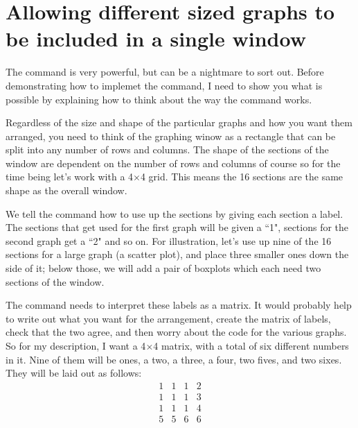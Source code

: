 \section{Allowing different sized graphs to be included in a single window} 
 
The  command is very powerful, but can be a nightmare to sort out. Before demonstrating how to implemet the command, I need to show you what is possible by explaining how to think about the way the command works. 
 
Regardless of the size and shape of the particular graphs and how you want them arranged, you need to think of the graphing winow as a rectangle that can be split into any number of rows and columns. The shape of the sections of the window are dependent on the number of rows and columns of course so for the time being let's work with a 4$\times$4 grid. This means the 16 sections are the same shape as the overall window. 
 
We tell the  command how to use up the sections by giving each section a label. The sections that get used for the first graph will be given a ``1", sections for the second graph get a ``2" and so on. For illustration, let's use up nine of the 16 sections for a large graph (a scatter plot), and place three smaller ones down the side of it; below those, we will add a pair of boxplots which each need two sections of the window. 
 
The  command needs to interpret these labels as a matrix. It would probably help to write out what you want for the arrangement, create the matrix of labels, check that the two agree, and then worry about the code for the various graphs. So for my description, I want a 4$\times$4 matrix, with a total of six different numbers in it. Nine of them will be ones, a two, a three, a four, two fives, and two sixes. They will be laid out as follows: 
$$\begin{array}{cccc} 1&1&1&2\\ 1&1&1&3\\ 1&1&1&4\\ 5&5&6&6\\ \end{array}$$ 
 
